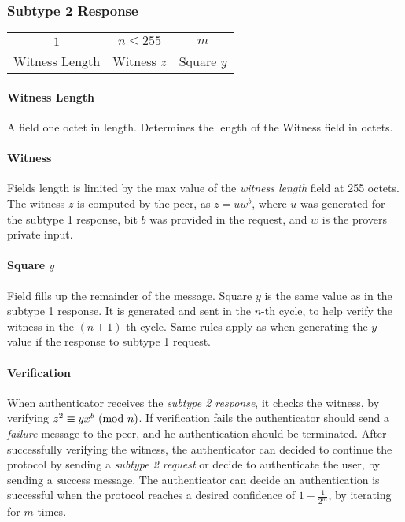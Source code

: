 \subsubsection{Subtype 2 Response}

\begin{center}
\begin{tabular}{|c|c|c|}
	\hline
	$1$ & $n \le 255 $ & $m$\\
	\hline
	Witness Length & Witness $z$ & Square $y$\\ %
	\hline
\end{tabular}
\end{center}

\paragraph{Witness Length} A field one octet in length. Determines the length of the Witness field in octets.

\paragraph{Witness} Fields length is limited by the max value of the \textit{witness length} field at 255 octets.
The witness $z$ is computed by the peer, as $z = uw^b$, where $u$ was generated for the subtype 1 response, bit $b$ was provided in the request, and $w$ is the provers private input.

\paragraph{Square $y$} Field fills up the remainder of the message. 
Square $y$ is the same value as in the subtype 1 response.
It is generated and sent in the $n$-th cycle, to help verify the witness in the $(n+1)$-th cycle.
Same rules apply as when generating the $y$ value if the response to subtype 1 request.

\paragraph{Verification}
When authenticator receives the \textit{subtype 2 response}, it checks the witness, by verifying $z^2 \equiv yx^b \ (\mathrm{mod}\ n)$.
If verification fails the authenticator should send a \textit{failure} message to the peer, and he authentication should be terminated.
After successfully verifying the witness, the authenticator can decided to continue the protocol by sending a \textit{subtype 2 request} or decide to authenticate the user, by sending a \textit success message.
The authenticator can decide an authentication is successful when the protocol reaches a desired confidence of $1 - \frac{1}{2^m}$, by iterating for $m$ times.

